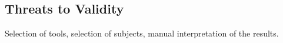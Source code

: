 \subsection{Threats to Validity}
\label{sec:threats}

Selection of tools, selection of subjects, manual interpretation of the results.
